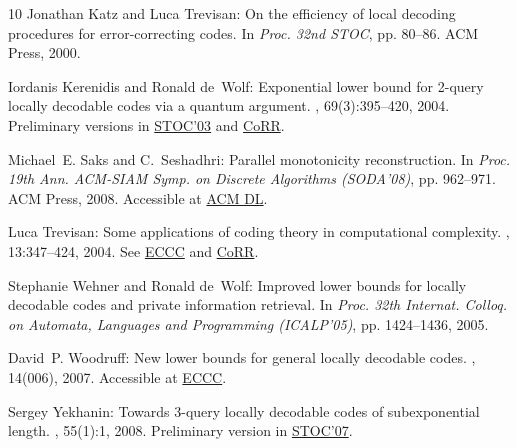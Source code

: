 \begin{thebibliography}{10}
{\sc Jonathan Katz and Luca Trevisan}: On the efficiency of local decoding
  procedures for error-correcting codes.
\newblock In {\em Proc. 32nd STOC}, pp. 80--86. ACM Press, 2000.
\newblock [\epfmtdoi{10.1145/335305.335315}]

{\sc Iordanis Kerenidis and Ronald de~Wolf}: Exponential lower bound for
  2-query locally decodable codes via a quantum argument.
, 69(3):395--420, 2004.
\newblock Preliminary versions in
  \href{http://dx.doi.org/10.1145/780542.780560}{STOC'03} and
  \href{http://arxiv.org/abs/quant-ph/0208062}{CoRR}.

{\sc Michael~E. Saks and C.~Seshadhri}: Parallel monotonicity reconstruction.
\newblock In {\em Proc. 19th Ann. ACM-SIAM Symp. on Discrete Algorithms
  (SODA'08)}, pp. 962--971. ACM Press, 2008.
\newblock Accessible at
  \href{http://dl.acm.org/citation.cfm?id=1347082.1347187}{ACM DL}.

{\sc Luca Trevisan}: Some applications of coding theory in computational
  complexity.
, 13:347--424, 2004.
\newblock See
  \href{http://eccc.hpi-web.de/eccc-reports/2004/TR04-043/index.html}{ECCC} and
  \href{http://arxiv.org/abs/cs.CC/0409044}{CoRR}.

{\sc Stephanie Wehner and Ronald de~Wolf}: Improved lower bounds for locally
  decodable codes and private information retrieval.
\newblock In {\em Proc. 32th Internat. Colloq. on Automata, Languages and
  Programming (ICALP'05)}, pp. 1424--1436, 2005.

{\sc David~P. Woodruff}: New lower bounds for general locally decodable codes.
,
  14(006), 2007.
\newblock Accessible at \href{http://eccc.hpi-web.de/report/2007/006/}{ECCC}.

{\sc Sergey Yekhanin}: Towards 3-query locally decodable codes of
  subexponential length.
, 55(1):1, 2008.
\newblock Preliminary version in
  \href{http://dx.doi.org/10.1145/1250790.1250830}{STOC'07}.
\newblock [\epfmtdoi{10.1145/1326554.1326555}]

\end{thebibliography}
